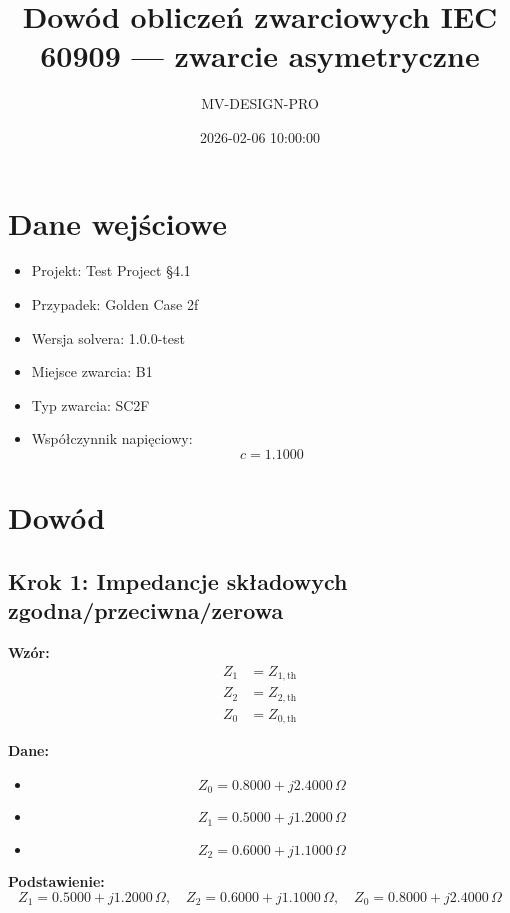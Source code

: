 \documentclass[11pt,a4paper]{article}
\title{Dowód obliczeń zwarciowych IEC 60909 — zwarcie asymetryczne}
\author{MV-DESIGN-PRO}
\date{2026-02-06 10:00:00}
\begin{document}
\maketitle

\tableofcontents

\newpage

\section{Dane wejściowe}
\begin{itemize}
  \item Projekt: Test Project §4.1
  \item Przypadek: Golden Case 2f
  \item Wersja solvera: 1.0.0-test
  \item Miejsce zwarcia: B1
  \item Typ zwarcia: SC2F
  \item Współczynnik napięciowy:
$$
c = 1.1000
$$
\end{itemize}





\section{Dowód}

\subsection{Krok 1: Impedancje składowych zgodna/przeciwna/zerowa}

\textbf{Wzór:}
$$
\begin{aligned}Z_1 &= Z_{1,\mathrm{th}} \\Z_2 &= Z_{2,\mathrm{th}} \\Z_0 &= Z_{0,\mathrm{th}}\end{aligned}
$$

\textbf{Dane:}
\begin{itemize}
  \item
$$
Z_0 = 0.8000 + j2.4000\,\Omega
$$
  \item
$$
Z_1 = 0.5000 + j1.2000\,\Omega
$$
  \item
$$
Z_2 = 0.6000 + j1.1000\,\Omega
$$
\end{itemize}

\textbf{Podstawienie:}
$$
Z_1 = 0.5000 + j1.2000\,\Omega, \quad Z_2 = 0.6000 + j1.1000\,\Omega, \quad Z_0 = 0.8000 + j2.4000\,\Omega
$$
\end{document}
